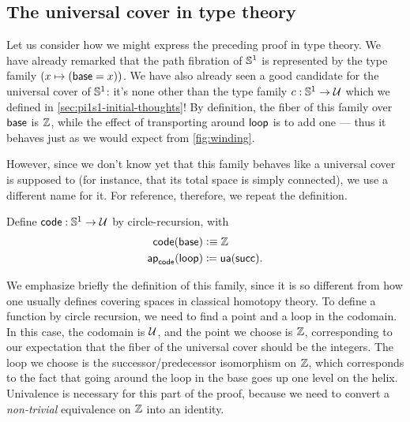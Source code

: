 %

\subsection{The universal cover in type theory}
\label{sec:pi1s1-universal-cover}

%
%
%

Let us consider how we might express the preceding proof in type theory.
We have already remarked that the path fibration of $\mathbb{S}^1$ is represented by the type family $(x\mapsto (\mathsf{base}=x))$.
We have also already seen a good candidate for the universal cover of $\mathbb{S}^1$: it's none other than the type family $c:\mathbb{S}^1\to\mathcal{U}$ which we defined in \autoref{sec:pi1s1-initial-thoughts}!
By definition, the fiber of this family over $\mathsf{base}$ is $\mathbb{Z}$, while the effect of transporting around $\mathsf{loop}$ is to add one --- thus it behaves just as we would expect from \autoref{fig:winding}.

However, since we don't know yet that this family behaves like a universal cover is supposed to (for instance, that its total space is simply connected), we use a different name for it.
For reference, therefore, we repeat the definition.

\begin{defn} \label{S1-universal-cover}
  Define $\mathsf{code} : \mathbb{S} ^1 \to \mathcal{U}$ by circle-recursion, with 
  \begin{align*}
    \mathsf{code}(\mathsf{base}) &\vcentcolon\equiv \mathbb{Z} \\
    \mathsf{ap}_{\mathsf{code}}({\mathsf{loop}}) &\coloneqq \mathsf{ua}(\mathsf{succ}).
  \end{align*}
\end{defn}

We emphasize briefly the definition of this family, since it is so different from how one usually defines covering spaces in classical homotopy theory.
To define a function by circle recursion, we need to find a point and a
loop in the codomain.  In this case, the codomain is $\mathcal{U}$, and the point
we choose is $\mathbb{Z}$, corresponding to our expectation that the
fiber of the universal cover should be the integers.  The loop we choose
is the successor/predecessor
%
%
isomorphism on $\mathbb{Z}$, which
corresponds to the fact that going around the loop in the base goes up
one level on the helix.  Univalence is necessary for this part of the
proof, because we need to convert a \emph{non-trivial} equivalence on $\mathbb{Z}$ into an identity.  

